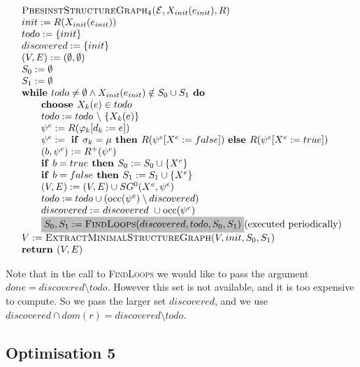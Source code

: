 \documentclass{article}
\newcommand{\Space}{\text{\ }}
\newcommand{\If}{\text{\textbf{if }}}
\newcommand{\Do}{\text{\textbf{ do }}}
\newcommand{\Then}{\text{\textbf{ then }}}
\newcommand{\Else}{\text{\textbf{else }}}
\newcommand{\While}{\text{\textbf{while }}}
\newcommand{\Choose}{\text{\textbf{choose }}}
\newcommand{\Return}{\text{\textbf{return }}}
\begin{document}
\begin{equation*}
\begin{array}{l}
\textsc{PbesinstStructureGraph$_{4}$(}\mathcal{E}, X_{init}(e_{init}), R) \\ 
init:=R(X_{init}(e_{init})) \\
todo:=\{init\} \\
discovered:=\{init\} \\
(V,E) :=(\emptyset ,\emptyset ) \\ 
S_0:= \emptyset \\
S_1:= \emptyset \\
\While todo \neq \emptyset \wedge X_{init}(e_{init}) \notin S_0 \cup S_1 \Do \\ 
\qquad \Choose X_{k}(e)\in todo \\ 
\qquad todo:=todo\ \backslash \ \{X_{k}(e)\} \\ 
\qquad \psi ^{e}:=R(\varphi _{k}[d_{k}:=e]) \\ 
\qquad \psi^e := \Space \If \sigma_k = \mu \Then R(\psi^e[X^e := false])
\Space \Else R(\psi^e[X^e := true]) \\
\qquad (b,\psi^e) := R^+(\psi^e) \\
\qquad \If b = true \Then S_0 := S_0 \cup \{ X^e \} \\
\qquad \If b = false \Then S_1 := S_1 \cup \{ X^e \} \\
\qquad (V,E) := (V,E) \cup SG^{0}(X^{e},\psi ^{e}) \\ 
\qquad todo:=todo\cup (\mathrm{occ}(\psi ^{e})\setminus discovered) \\
\qquad discovered:=discovered\ \cup \mathrm{occ}(\psi ^{e}) \\
\qquad \colorbox{lightgray}{$%
S_0, S_1 := \text{\textsc{FindLoops}}(discovered, todo, S_0, S_1) $} \text{(executed periodically)} \\
V := \textsc{ExtractMinimalStructureGraph}(V, init, S_0, S_1) \\
\Return (V, E)
\end{array}%
\end{equation*}%

Note that in the call to \textsc{FindLoops} we would like to pass the argument $done = discovered \setminus todo$.
However this set is not available, and it is too expensive to compute. So we pass the larger set $discovered$, and we use $discovered \cap dom(r) = discovered \setminus todo$.

\subsection{Optimisation 5} 
\end{document}
